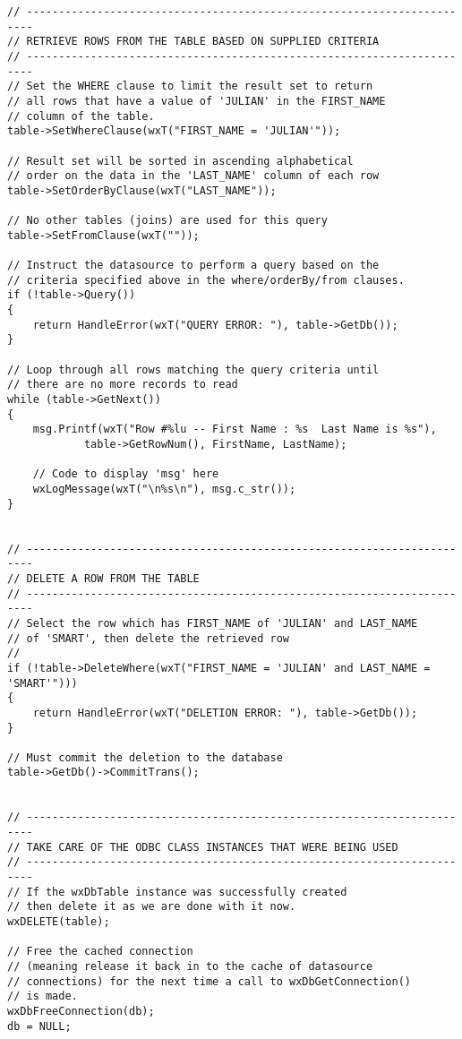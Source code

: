 \begin{verbatim}
// -----------------------------------------------------------------------
// RETRIEVE ROWS FROM THE TABLE BASED ON SUPPLIED CRITERIA
// -----------------------------------------------------------------------
// Set the WHERE clause to limit the result set to return
// all rows that have a value of 'JULIAN' in the FIRST_NAME
// column of the table.
table->SetWhereClause(wxT("FIRST_NAME = 'JULIAN'"));

// Result set will be sorted in ascending alphabetical 
// order on the data in the 'LAST_NAME' column of each row
table->SetOrderByClause(wxT("LAST_NAME"));

// No other tables (joins) are used for this query
table->SetFromClause(wxT(""));

// Instruct the datasource to perform a query based on the 
// criteria specified above in the where/orderBy/from clauses.
if (!table->Query())
{
    return HandleError(wxT("QUERY ERROR: "), table->GetDb());
}

// Loop through all rows matching the query criteria until
// there are no more records to read
while (table->GetNext())
{
    msg.Printf(wxT("Row #%lu -- First Name : %s  Last Name is %s"),
            table->GetRowNum(), FirstName, LastName);

    // Code to display 'msg' here
    wxLogMessage(wxT("\n%s\n"), msg.c_str());
}


// -----------------------------------------------------------------------
// DELETE A ROW FROM THE TABLE
// -----------------------------------------------------------------------
// Select the row which has FIRST_NAME of 'JULIAN' and LAST_NAME
// of 'SMART', then delete the retrieved row
//
if (!table->DeleteWhere(wxT("FIRST_NAME = 'JULIAN' and LAST_NAME = 'SMART'")))
{
    return HandleError(wxT("DELETION ERROR: "), table->GetDb());
}
    
// Must commit the deletion to the database
table->GetDb()->CommitTrans();


// -----------------------------------------------------------------------
// TAKE CARE OF THE ODBC CLASS INSTANCES THAT WERE BEING USED
// -----------------------------------------------------------------------
// If the wxDbTable instance was successfully created
// then delete it as we are done with it now.
wxDELETE(table);

// Free the cached connection
// (meaning release it back in to the cache of datasource
// connections) for the next time a call to wxDbGetConnection()
// is made.
wxDbFreeConnection(db);
db = NULL;



\end{verbatim}
